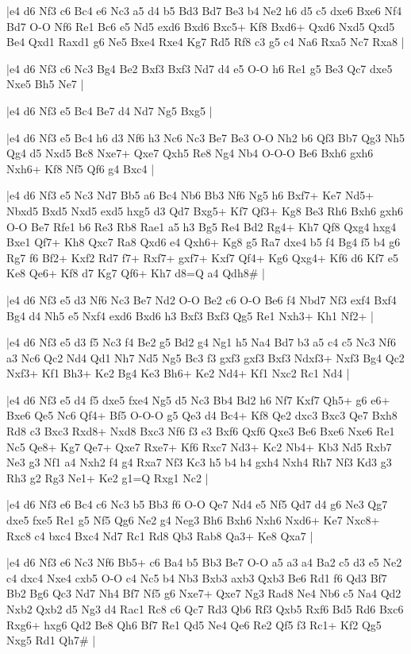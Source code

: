 \whitename{}
\blackname{}
\makegametitle
|e4 d6 Nf3 c6 Bc4 e6 Nc3 a5 d4 b5 Bd3 Bd7 Be3 b4 Ne2 h6 d5 c5 dxe6 Bxe6 Nf4 Bd7 O-O Nf6 Re1 Bc6 e5 Nd5 exd6 Bxd6 Bxc5+ Kf8 Bxd6+ Qxd6 Nxd5 Qxd5 Be4 Qxd1 Raxd1 g6 Ne5 Bxe4 Rxe4 Kg7 Rd5 Rf8 c3 g5 c4 Na6 Rxa5 Nc7 Rxa8  |

\whitename{}
\blackname{}
\makegametitle
|e4 d6 Nf3 c6 Nc3 Bg4 Be2 Bxf3 Bxf3 Nd7 d4 e5 O-O h6 Re1 g5 Be3 Qc7 dxe5 Nxe5 Bh5 Ne7  |

\whitename{}
\blackname{}
\makegametitle
|e4 d6 Nf3 e5 Bc4 Be7 d4 Nd7 Ng5 Bxg5  |

\whitename{}
\blackname{}
\makegametitle
|e4 d6 Nf3 e5 Bc4 h6 d3 Nf6 h3 Nc6 Nc3 Be7 Be3 O-O Nh2 b6 Qf3 Bb7 Qg3 Nh5 Qg4 d5 Nxd5 Bc8 Nxe7+ Qxe7 Qxh5 Re8 Ng4 Nb4 O-O-O Be6 Bxh6 gxh6 Nxh6+ Kf8 Nf5 Qf6 g4 Bxc4  |

\whitename{}
\blackname{}
\makegametitle
|e4 d6 Nf3 e5 Nc3 Nd7 Bb5 a6 Bc4 Nb6 Bb3 Nf6 Ng5 h6 Bxf7+ Ke7 Nd5+ Nbxd5 Bxd5 Nxd5 exd5 hxg5 d3 Qd7 Bxg5+ Kf7 Qf3+ Kg8 Be3 Rh6 Bxh6 gxh6 O-O Be7 Rfe1 b6 Re3 Rb8 Rae1 a5 h3 Bg5 Re4 Bd2 Rg4+ Kh7 Qf8 Qxg4 hxg4 Bxe1 Qf7+ Kh8 Qxc7 Ra8 Qxd6 e4 Qxh6+ Kg8 g5 Ra7 dxe4 b5 f4 Bg4 f5 b4 g6 Rg7 f6 Bf2+ Kxf2 Rd7 f7+ Rxf7+ gxf7+ Kxf7 Qf4+ Kg6 Qxg4+ Kf6 d6 Kf7 e5 Ke8 Qe6+ Kf8 d7 Kg7 Qf6+ Kh7 d8=Q a4 Qdh8\#  |

\whitename{}
\blackname{}
\makegametitle
|e4 d6 Nf3 e5 d3 Nf6 Nc3 Be7 Nd2 O-O Be2 c6 O-O Be6 f4 Nbd7 Nf3 exf4 Bxf4 Bg4 d4 Nh5 e5 Nxf4 exd6 Bxd6 h3 Bxf3 Bxf3 Qg5 Re1 Nxh3+ Kh1 Nf2+  |

\whitename{}
\blackname{}
\makegametitle
|e4 d6 Nf3 e5 d3 f5 Nc3 f4 Be2 g5 Bd2 g4 Ng1 h5 Na4 Bd7 b3 a5 c4 c5 Nc3 Nf6 a3 Nc6 Qc2 Nd4 Qd1 Nh7 Nd5 Ng5 Bc3 f3 gxf3 gxf3 Bxf3 Ndxf3+ Nxf3 Bg4 Qc2 Nxf3+ Kf1 Bh3+ Ke2 Bg4 Ke3 Bh6+ Ke2 Nd4+ Kf1 Nxc2 Rc1 Nd4  |

\whitename{}
\blackname{}
\makegametitle
|e4 d6 Nf3 e5 d4 f5 dxe5 fxe4 Ng5 d5 Nc3 Bb4 Bd2 h6 Nf7 Kxf7 Qh5+ g6 e6+ Bxe6 Qe5 Nc6 Qf4+ Bf5 O-O-O g5 Qe3 d4 Bc4+ Kf8 Qe2 dxc3 Bxc3 Qe7 Bxh8 Rd8 c3 Bxc3 Rxd8+ Nxd8 Bxc3 Nf6 f3 e3 Bxf6 Qxf6 Qxe3 Be6 Bxe6 Nxe6 Re1 Nc5 Qe8+ Kg7 Qe7+ Qxe7 Rxe7+ Kf6 Rxc7 Nd3+ Kc2 Nb4+ Kb3 Nd5 Rxb7 Ne3 g3 Nf1 a4 Nxh2 f4 g4 Rxa7 Nf3 Kc3 h5 b4 h4 gxh4 Nxh4 Rh7 Nf3 Kd3 g3 Rh3 g2 Rg3 Ne1+ Ke2 g1=Q Rxg1 Nc2  |

\whitename{}
\blackname{}
\makegametitle
|e4 d6 Nf3 e6 Bc4 c6 Nc3 b5 Bb3 f6 O-O Qe7 Nd4 e5 Nf5 Qd7 d4 g6 Ne3 Qg7 dxe5 fxe5 Re1 g5 Nf5 Qg6 Ne2 g4 Neg3 Bh6 Bxh6 Nxh6 Nxd6+ Ke7 Nxc8+ Rxc8 c4 bxc4 Bxc4 Nd7 Rc1 Rd8 Qb3 Rab8 Qa3+ Ke8 Qxa7  |

\whitename{}
\blackname{}
\makegametitle
|e4 d6 Nf3 e6 Nc3 Nf6 Bb5+ c6 Ba4 b5 Bb3 Be7 O-O a5 a3 a4 Ba2 c5 d3 e5 Ne2 c4 dxc4 Nxe4 cxb5 O-O c4 Nc5 b4 Nb3 Bxb3 axb3 Qxb3 Be6 Rd1 f6 Qd3 Bf7 Bb2 Bg6 Qc3 Nd7 Nh4 Bf7 Nf5 g6 Nxe7+ Qxe7 Ng3 Rad8 Ne4 Nb6 c5 Na4 Qd2 Nxb2 Qxb2 d5 Ng3 d4 Rac1 Rc8 c6 Qc7 Rd3 Qb6 Rf3 Qxb5 Rxf6 Bd5 Rd6 Bxc6 Rxg6+ hxg6 Qd2 Be8 Qh6 Bf7 Re1 Qd5 Ne4 Qe6 Re2 Qf5 f3 Rc1+ Kf2 Qg5 Nxg5 Rd1 Qh7\#  |

